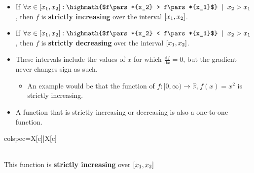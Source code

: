 \documentclass[12pt,a4paper,titlepage]{article}
\newcommand{\diff}[2][]{\frac{\text{d}#1}{\text{d}#2}}
\DeclarePairedDelimiter {\pars}  {  (      }     {  )      }
\DeclarePairedDelimiter {\bracs} {  [      }     {  ]      }
\begin{document}
            \begin{SummaryBox}[title=Increasing and decreasing functions, leftlower=0pt, rightlower=0pt]
                \begin{itemize}[leftmargin=*]
                    \item If $\forall x \in \bracs*{x_1, x_2}: \highmath{$f\pars*{x_2} > f\pars*{x_1}$} \; \mid \; x_2 > x_1$, then $f$ is \textbf{strictly increasing} over the interval $\bracs*{x_1, x_2}$.
                    \item If $\forall x \in \bracs*{x_1, x_2}: \highmath{$f\pars*{x_2} < f\pars*{x_1}$} \; \mid \; x_2 > x_1$, then $f$ is \textbf{strictly decreasing} over the interval $\bracs*{x_1, x_2}$.
                    \item These intervals include the values of $x$ for which $\diff[f]{x}=0$, but the gradient never changes sign as such.
                    \begin{itemize}[topsep=0pt]
                        \item An example would be that the function of $f:[0,\infty) \to \mathbb{R}, f(x) = x^2$ is strictly increasing.
                    \end{itemize}
                    \item A function that is strictly increasing or decreasing is also a one-to-one function.
                \end{itemize}
                \tcblower
                \begin{tblr}{colspec={X[c]|X[c]}}
                    {\\
                    This function is \textbf{strictly increasing} over $\bracs*{x_1, x_2}$}
                    

\end{tblr}
\end{SummaryBox}
\end{document}
